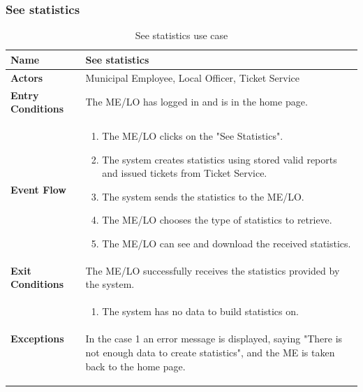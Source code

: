 					\subsubsection{See statistics}
					\begin{table}[!h]
						\centering
						\vspace{-4mm}
						\begin{tabular}{lp{}}
							\toprule
							\textbf{Name} & \textbf{See statistics} \\[1mm]
							\midrule
							\textbf{Actors} & Municipal Employee, Local Officer, Ticket Service \\[1mm]
							\textbf{Entry Conditions} & The ME/LO has logged in and is in the home page. \vspace{1mm}\\
							\textbf{Event Flow} &
							\vspace{-5mm} 
							\begin{enumerate}
								\setlength\itemsep{0.1mm}
								\item The ME/LO clicks on the "See Statistics".
								\item The system creates statistics using stored valid reports and issued tickets from Ticket Service.
								\item The system sends the statistics to the ME/LO.
								\item The ME/LO chooses the type of statistics to retrieve.
								\item The ME/LO can see and download the received statistics.
							\end{enumerate} \\
							\textbf{Exit Conditions} & The ME/LO successfully receives the statistics provided by the system. \vspace{1mm}\\
							\textbf{Exceptions} & 
								\vspace{-5mm} 
								\begin{enumerate}
									\item The system has no data to build statistics on.
								\end{enumerate}
								\vspace{-7mm}
								\paragraph{}
									In the case 1 an error message is displayed, saying "There is not enough data to create statistics", and the ME is taken back to the home page.\\
							\bottomrule
						\end{tabular}
						\caption{See statistics use case}
					\end{table}
					
